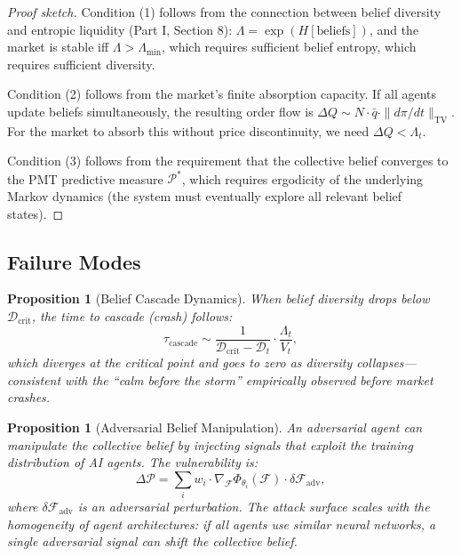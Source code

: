 \documentclass[12pt,a4paper]{article}
\newtheorem{proposition}[theorem]{Proposition}
\theoremstyle{definition}
\newcommand{\F}{\mathcal{F}}
\newcommand{\PP}{\mathcal{P}}
\begin{document}
\begin{proof}[Proof sketch]
Condition (1) follows from the connection between belief diversity and entropic liquidity (Part I, Section 8): $\Lambda = \exp(H[\text{beliefs}])$, and the market is stable iff $\Lambda > \Lambda_{\mathrm{min}}$, which requires sufficient belief entropy, which requires sufficient diversity.

Condition (2) follows from the market's finite absorption capacity. If all agents update beliefs simultaneously, the resulting order flow is $\Delta Q \sim N \cdot \bar{q} \cdot \|d\pi/dt\|_{\mathrm{TV}}$. For the market to absorb this without price discontinuity, we need $\Delta Q < \Lambda_t$.

Condition (3) follows from the requirement that the collective belief converges to the PMT predictive measure $\PP^*$, which requires ergodicity of the underlying Markov dynamics (the system must eventually explore all relevant belief states).
\end{proof}

\subsection{Failure Modes}

\begin{proposition}[Belief Cascade Dynamics]\label{prop:cascade}
When belief diversity drops below $\mathcal{D}_{\mathrm{crit}}$, the time to cascade (crash) follows:
\begin{equation}
  \tau_{\mathrm{cascade}} \sim \frac{1}{\mathcal{D}_{\mathrm{crit}} - \mathcal{D}_t} \cdot \frac{\Lambda_t}{V_t},
\end{equation}
which diverges at the critical point and goes to zero as diversity collapses---consistent with the ``calm before the storm'' empirically observed before market crashes.
\end{proposition}

\begin{proposition}[Adversarial Belief Manipulation]\label{prop:adversarial}
An adversarial agent can manipulate the collective belief by injecting signals that exploit the training distribution of AI agents. The vulnerability is:
\begin{equation}
  \Delta \PP = \sum_i w_i \cdot \nabla_{\F} \Phi_{\theta_i}(\F) \cdot \delta\F_{\mathrm{adv}},
\end{equation}
where $\delta\F_{\mathrm{adv}}$ is an adversarial perturbation. The attack surface scales with the \emph{homogeneity} of agent architectures: if all agents use similar neural networks, a single adversarial signal can shift the collective belief.
\end{proposition}
\end{document}

